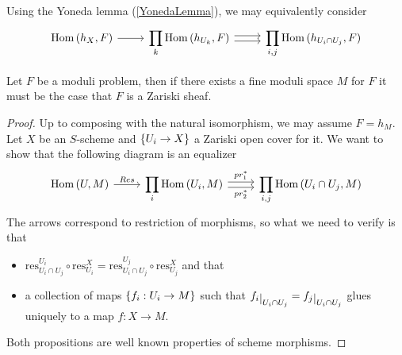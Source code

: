\begin{remark}
Using the Yoneda lemma (\ref{YonedaLemma}), we may equivalently consider
\[\begin{tikzcd}
	{\Hom(h_X,F)} & {\displaystyle \prod_k \Hom(h_{U_k},F)} & {\displaystyle \prod_{i,j}\Hom(h_{U_i\cap U_j},F)}
	\arrow[from=1-1, to=1-2]
	\arrow[shift left, from=1-2, to=1-3]
	\arrow[shift right, from=1-2, to=1-3]
\end{tikzcd}\]
\end{remark}


\begin{proposition}\label{RepresentableModuliFunctorsAreZariskiSheaves}
Let $F$ be a moduli problem, then if there exists a fine moduli space $M$ for $F$ it must be the case that $F$ is a Zariski sheaf.
\end{proposition}
\begin{proof}
Up to composing with the natural isomorphism, we may assume $F=h_M$. 
Let $X$ be an $S$-scheme and $\left\{{U_i\to X}\right\}$ a Zariski open cover for it. 
We want to show that the following diagram is an equalizer
\[\begin{tikzcd}
	{\Hom(U,M)} & {\displaystyle \prod_i \Hom(U_i,M)} & {\displaystyle \prod_{i,j}\Hom(U_i\cap U_j,M)}
	\arrow["Res", from=1-1, to=1-2]
	\arrow["{pr_1^\ast}", shift left, from=1-2, to=1-3]
	\arrow["{pr_2^\ast}"', shift right, from=1-2, to=1-3]
\end{tikzcd}\]
The arrows correspond to restriction of morphisms, so what we need to verify is that
\begin{itemize}
\item $\mathrm{res}^{U_i}_{U_i\cap U_j}\circ \mathrm{res}^X_{U_i}=\mathrm{res}^{U_j}_{U_i\cap U_j}\circ \mathrm{res}^X_{U_j}$ and that
\item a collection of maps $\left\{{f_i:U_i\to M}\right\}$ such that $f_i\res{U_i\cap U_j}=f_j\res{U_i\cap U_j}$ glues uniquely to a map $f:X\to M$.
\end{itemize}
Both propositions are well known properties of scheme morphisms.
\end{proof}

